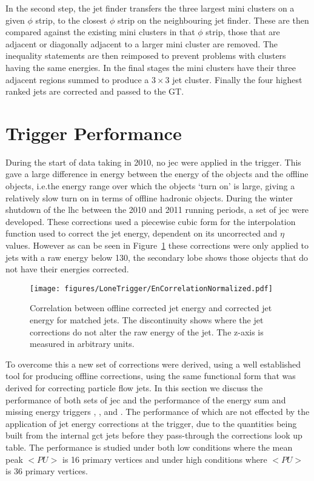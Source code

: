 In the second step, the jet finder transfers the three largest mini clusters on 
a given $\phi$ strip, to the closest $\phi$ strip on the neighbouring jet 
finder. These are then compared against the existing mini clusters in that 
$\phi$ strip, those that are adjacent or diagonally adjacent to a larger mini 
cluster are removed. The inequality statements are then reimposed to prevent 
problems with clusters having the same energies. In the final stages the mini 
clusters have their three adjacent regions summed to produce a $3 \times 3$ 
jet cluster. Finally the four highest ranked jets are corrected and passed to 
the GT.

\section{\Lone Trigger Performance} %

During the start of data taking in 2010, no \ac{jec} were 
applied in the \Lone trigger. This gave a large difference in energy between the energy of the \Lone objects and the offline objects, i.e.the energy range over which the objects `turn on' is large, giving a relatively slow turn on in terms of offline hadronic objects.
During the winter shutdown of the \ac{lhc} between the 2010 and 2011 running 
periods, a set of \Lone \ac{jec} were developed. These corrections used a 
piecewise cubic form for the interpolation function used to correct the jet 
energy, dependent  on its uncorrected \ET and $\eta$ values. However as can be 
seen in Figure~\ref{fig:figures_LoneTrigger_EnCorrelationNormalized} these 
corrections were only applied to jets with a raw energy below \unit{130}{\GeV}, 
the secondary lobe shows those objects that do not have their energies 
corrected.

\begin{figure}[htbp]
  \centering
    \texttt{[image: figures/LoneTrigger/EnCorrelationNormalized.pdf]}
  \caption{Correlation between offline corrected jet energy and \Lone corrected jet energy for matched jets. The discontinuity shows where the \Lone jet corrections do not alter the raw energy of the jet. The z-axis is measured in arbitrary units.}
  \label{fig:figures_LoneTrigger_EnCorrelationNormalized}
\end{figure}

To overcome this a new set of corrections were derived, using a well established tool for producing offline corrections, 
using the same functional form that was derived for correcting particle flow 
jets. In this section we discuss the performance of both sets of \Lone \ac{jec} and the performance of the energy sum and missing energy triggers \HT, \HTm, and \MET. The performance of which are not effected by the application of jet energy corrections at the \Lone trigger, due to the quantities being built from the internal \ac{gct} jets before they pass-through the corrections look up table. The performance is studied under both low \pu conditions where the mean peak \pu $<PU>$ is 16 primary vertices and under high \pu conditions where $<PU>$ is 36 primary vertices.

